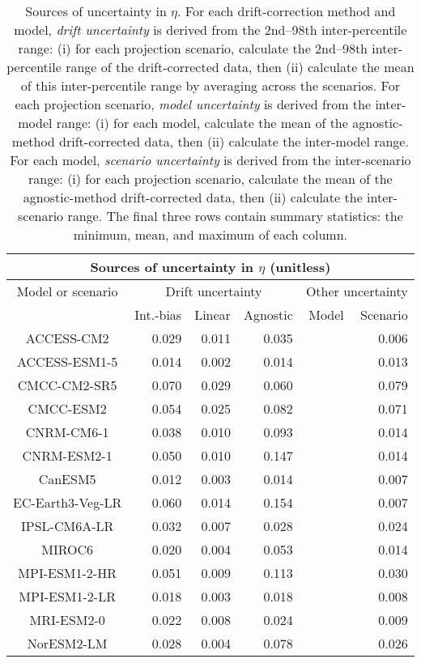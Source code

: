 \begin{table*}[t]
\centering
\caption{Sources of uncertainty in $\eta$. For each drift-correction method and model, \emph{drift uncertainty} is derived from the 2nd--98th inter-percentile range: (i) for each projection scenario, calculate the 2nd--98th inter-percentile range of the drift-corrected data, then (ii) calculate the mean of this inter-percentile range by averaging across the scenarios. For each projection scenario, \emph{model uncertainty} is derived from the inter-model range: (i) for each model, calculate the mean of the agnostic-method drift-corrected data, then (ii) calculate the inter-model range. For each model, \emph{scenario uncertainty} is derived from the inter-scenario range: (i) for each projection scenario, calculate the mean of the agnostic-method drift-corrected data, then (ii) calculate the inter-scenario range. The final three rows contain summary statistics: the minimum, mean, and maximum of each column.}
\begin{tabular}{c|rrr|rr}
\toprule
\multicolumn{6}{c}{Sources of uncertainty in $\eta$ (unitless)} \\ 
\midrule
Model or scenario & \multicolumn{3}{c|}{Drift uncertainty} & \multicolumn{2}{c}{Other uncertainty} \\
 & Int.-bias & Linear & Agnostic & Model & Scenario \\
\midrule
ACCESS-CM2 & 0.029 & 0.011 & 0.035 &  & 0.006 \\
ACCESS-ESM1-5 & 0.014 & 0.002 & 0.014 &  & 0.013 \\
CMCC-CM2-SR5 & 0.070 & 0.029 & 0.060 &  & 0.079 \\
CMCC-ESM2 & 0.054 & 0.025 & 0.082 &  & 0.071 \\
CNRM-CM6-1 & 0.038 & 0.010 & 0.093 &  & 0.014 \\
CNRM-ESM2-1 & 0.050 & 0.010 & 0.147 &  & 0.014 \\
CanESM5 & 0.012 & 0.003 & 0.014 &  & 0.007 \\
EC-Earth3-Veg-LR & 0.060 & 0.014 & 0.154 &  & 0.007 \\
IPSL-CM6A-LR & 0.032 & 0.007 & 0.028 &  & 0.024 \\
MIROC6 & 0.020 & 0.004 & 0.053 &  & 0.014 \\
MPI-ESM1-2-HR & 0.051 & 0.009 & 0.113 &  & 0.030 \\
MPI-ESM1-2-LR & 0.018 & 0.003 & 0.018 &  & 0.008 \\
MRI-ESM2-0 & 0.022 & 0.008 & 0.024 &  & 0.009 \\
NorESM2-LM & 0.028 & 0.004 & 0.078 &  & 0.026 \\

\end{tabular}
\end{table*}
